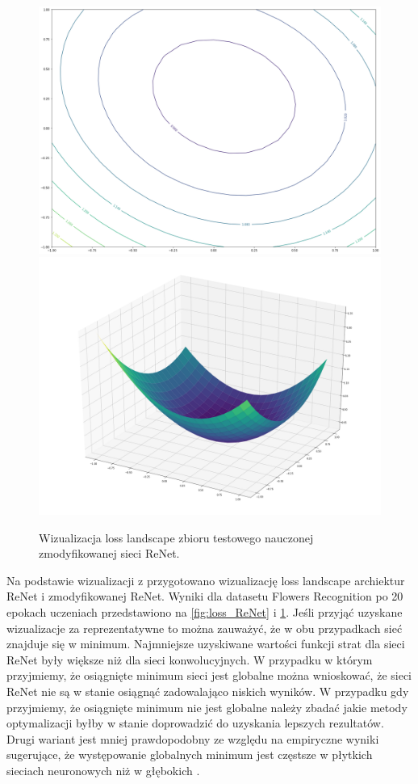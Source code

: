 \documentclass[oneside, mag]{mgr}
\begin{document}
\begin{figure}
\centering
	\includegraphics[width=1.0\textwidth]{img/loss_modif_ReNet.png}
	\includegraphics[width=1.0\textwidth]{img/loss_3d_modif_ReNet.png}
	\caption{Wizualizacja loss landscape zbioru testowego nauczonej zmodyfikowanej sieci ReNet.}
	\label{fig:loss_modif_ReNet}
\end{figure}

Na podstawie wizualizacji z \cite{DBLP:journals/corr/abs-1712-09913} przygotowano wizualizację loss landscape archiektur ReNet i zmodyfikowanej ReNet. Wyniki dla datasetu Flowers Recognition po 20 epokach uczeniach przedstawiono na \ref{fig:loss_ReNet} i \ref{fig:loss_modif_ReNet}. Jeśli przyjąć uzyskane wizualizacje za reprezentatywne to można zauważyć, że w obu przypadkach sieć znajduje się w minimum. Najmniejsze uzyskiwane wartości funkcji strat dla sieci ReNet były większe niż dla sieci konwolucyjnych. W przypadku w którym przyjmiemy, że osiągnięte minimum sieci jest globalne można wnioskować, że sieci ReNet nie są w stanie osiągnąć zadowalająco niskich wyników. W przypadku gdy przyjmiemy, że osiągnięte minimum nie jest globalne należy zbadać jakie metody optymalizacji byłby w stanie doprowadzić do uzyskania lepszych rezultatów. Drugi wariant jest mniej prawdopodobny ze względu na empiryczne wyniki sugerujące, że występowanie globalnych minimum jest częstsze w płytkich sieciach neuronowych niż w głębokich \cite{Goodfellow-et-al-2016}.
\end{document}
